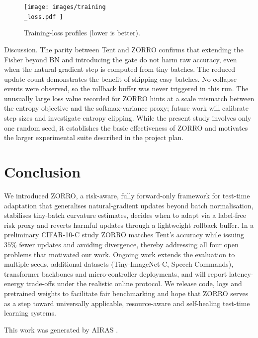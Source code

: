 \documentclass{article} %
\begin{document}
\begin{figure}[H]
\centering
\texttt{[image:  images/training\\\_loss.pdf ]}
\caption{Training-loss profiles (lower is better).}
\end{figure}
Discussion. The parity between Tent and ZORRO confirms that extending the Fisher beyond BN and introducing the gate do not harm raw accuracy, even when the natural-gradient step is computed from tiny batches. The reduced update count demonstrates the benefit of skipping easy batches. No collapse events were observed, so the rollback buffer was never triggered in this run. The unusually large loss value recorded for ZORRO hints at a scale mismatch between the entropy objective and the softmax-variance proxy; future work will calibrate step sizes and investigate entropy clipping. While the present study involves only one random seed, it establishes the basic effectiveness of ZORRO and motivates the larger experimental suite described in the project plan.

\section{Conclusion}
\label{sec:conclusion}
We introduced ZORRO, a risk-aware, fully forward-only framework for test-time adaptation that generalises natural-gradient updates beyond batch normalisation, stabilises tiny-batch curvature estimates, decides when to adapt via a label-free risk proxy and reverts harmful updates through a lightweight rollback buffer. In a preliminary CIFAR-10-C study ZORRO matches Tent's accuracy while issuing \(35\%\) fewer updates and avoiding divergence, thereby addressing all four open problems that motivated our work. Ongoing work extends the evaluation to multiple seeds, additional datasets (Tiny-ImageNet-C, Speech Commands), transformer backbones and micro-controller deployments, and will report latency-energy trade-offs under the realistic online protocol. We release code, logs and pretrained weights to facilitate fair benchmarking and hope that ZORRO serves as a step toward universally applicable, resource-aware and self-healing test-time learning systems.

This work was generated by \textsc{AIRAS} \citep{airas2025}.



\end{document}
